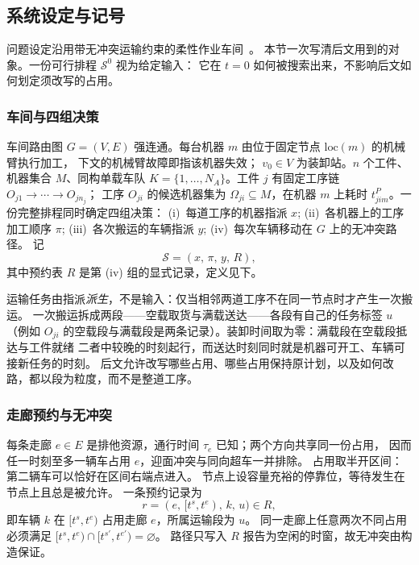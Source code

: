 \subsection{系统设定与记号}
\label{sec:system_brief}

问题设定沿用带无冲突运输约束的柔性作业车间~\cite{vanos2026exact}。
本节一次写清后文用到的对象。一份可行排程 \(\mathcal{S}^0\) 视为给定输入：
它在 \(t=0\) 如何被搜索出来，不影响后文如何划定须改写的占用。

\subsubsection{车间与四组决策}
\label{sec:shop}

车间路由图 \(G=(V,E)\) 强连通。每台机器 \(m\) 由位于固定节点 \(\mathrm{loc}(m)\) 的机械臂执行加工，
下文的机械臂故障即指该机器失效；
\(v_0\in V\) 为装卸站。\(n\) 个工件、机器集合 \(M\)、同构单载车队
\(K=\{1,\ldots,N_A\}\)。工件 \(j\) 有固定工序链 \(O_{j1}\to\cdots\to O_{jn_j}\)；
工序 \(O_{ji}\) 的候选机器集为 \(\Omega_{ji}\subseteq M\)，在机器 \(m\) 上耗时
\(t^P_{jim}\)。一份完整排程同时确定四组决策：
(i)~每道工序的机器指派 \(x\);
(ii)~各机器上的工序加工顺序 \(\pi\);
(iii)~各次搬运的车辆指派 \(y\);
(iv)~每次车辆移动在 \(G\) 上的无冲突路径。
记
\[
\mathcal{S}=(x,\,\pi,\,y,\,R),
\]
其中预约表 \(R\) 是第 (iv) 组的显式记录，定义见下。

运输任务由指派\emph{派生}，不是输入：仅当相邻两道工序不在同一节点时才产生一次搬运。
一次搬运拆成两段——空载取货与满载送达——各段有自己的任务标签 \(u\)
（例如 \(O_{ji}\) 的空载段与满载段是两条记录）。装卸时间取为零：满载段在空载段抵达与工件就绪
二者中较晚的时刻起行，而送达时刻同时就是机器可开工、车辆可接新任务的时刻。
后文允许改写哪些占用、哪些占用保持原计划，以及如何改路，都以段为粒度，而不是整道工序。

\subsubsection{走廊预约与无冲突}
\label{sec:reservation}

每条走廊 \(e\in E\) 是排他资源，通行时间 \(\tau_e\) 已知；两个方向共享同一份占用，
因而任一时刻至多一辆车占用 \(e\)，迎面冲突与同向超车一并排除。
占用取半开区间：第二辆车可以恰好在区间右端点进入。
节点上设容量充裕的停靠位，等待发生在节点上且总是被允许。
一条预约记录为
\[
r=(e,\,[t^s,t^e),\,k,\,u)\in R,
\]
即车辆 \(k\) 在 \([t^s,t^e)\) 占用走廊 \(e\)，所属运输段为 \(u\)。
同一走廊上任意两次不同占用必须满足
\([t^s,t^e)\cap[t^{s\prime},t^{e\prime})=\varnothing\)。
路径只写入 \(R\) 报告为空闲的时窗，故无冲突由构造保证。

